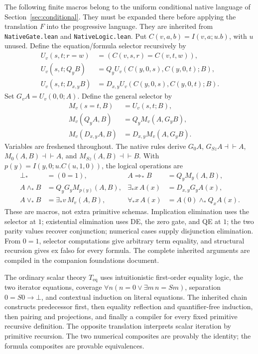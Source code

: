 \documentclass[11pt,a4paper]{article}
\theoremstyle{definition}\newtheorem{definition}[theorem]{Definition}
\newcommand{\Teq}{T_{\mathrm{eq}}}
\newcommand{\eqv}{\dashv\vdash}
\begin{document}
The following finite macros belong to the uniform conditional native
language of Section~\ref{sec:conditional}. They must be expanded there
before applying the translation $F$ into the progressive language.
They are inherited from \texttt{NativeGate.lean} and
\texttt{NativeLogic.lean}.\cite{native}
Put $C(v,a,b)=I(v,a;u.b)$, with $u$ unused. Define the equation/formula
selector recursively by
\[
\begin{aligned}
U_v(s,t;r=w)&=(C(v,s,r)=C(v,t,w)),\\
U_v(s,t;Q_yB)&=Q_yU_v(C(y,0,s),C(y,0,t);B),\\
U_v(s,t;D_{x,y}B)&=D_{x,y}U_v(C(y,0,s),C(y,0,t);B).
\end{aligned}
\]
Set $G_vA=U_v(0,0;A)$. Define the general selector by
\[
\begin{aligned}
M_v(s=t,B)&=U_v(s,t;B),\\
M_v(Q_yA,B)&=Q_yM_v(A,G_yB),\\
M_v(D_{x,y}A,B)&=D_{x,y}M_v(A,G_yB).
\end{aligned}
\]
Variables are freshened throughout. The native rules derive
$G_0A$, $G_{Sz}A\eqv A$, $M_0(A,B)\eqv A$, and
$M_{Sz}(A,B)\eqv B$. With
$p(y)=I(y,0;u.C(u,1,0))$, the logical operations are
\[
\begin{aligned}
\bot_*&=(0=1),&
A\Rightarrow_*B&=Q_yM_y(A,B),\\
A\wedge_*B&=Q_yG_yM_{p(y)}(A,B),&
\exists_*x\,A(x)&=D_{x,y}G_yA(x),\\
A\vee_*B&=\exists_*v\,M_v(A,B),&
\forall_*x\,A(x)&=A(0)\wedge_*Q_xA(x).
\end{aligned}
\]
These are macros, not extra primitive schemas. Implication elimination
uses the selector at $1$; existential elimination uses DE, the zero gate,
and QE at $1$; the two parity values recover conjunction; numerical
cases supply disjunction elimination. From $0=1$, selector computations
give arbitrary term equality, and structural recursion gives ex falso
for every formula. The complete inherited arguments are compiled in
the companion foundations document.

The ordinary scalar theory $\Teq$ uses intuitionistic first-order
equality logic, the two iterator equations, coverage
$\forall n(n=0\vee\exists m\,n=Sm)$, separation
$0=S0\to\bot$, and contextual induction on literal equations.
The inherited chain constructs predecessor first, then equality
reflection and quantifier-free induction, then pairing and projections,
and finally a compiler for every fixed primitive recursive definition.
The opposite translation interprets scalar iteration by primitive
recursion. The two numerical composites are provably the identity;
the formula composites are provable equivalences.\cite{bridge}
\end{document}
